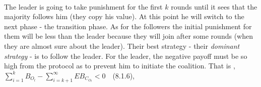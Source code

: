 \documentclass{article}
\begin{document}
\paragraph{ }
The leader is going to take punishment for the first $k$ rounds until it sees that the majority follows him (they copy his value). At this point he will switch to the next phase - the transition phase. As for the followers the initial punishment for them will be less than the leader because they will join after some rounds (when they are almost sure about the leader). Their best strategy - their \emph{dominant strategy} - is to follow the leader.
For the leader, the negative payoff must be so high from the protocol as to prevent him to initiate the coalition. That is ,\\
$\displaystyle\sum^{k}_{i=1}B_{O_l} -\displaystyle\sum^{\infty}_{i=k+1}EB_{C_{O_l}}<0$~~(8.1.6),\\
\end{document}
